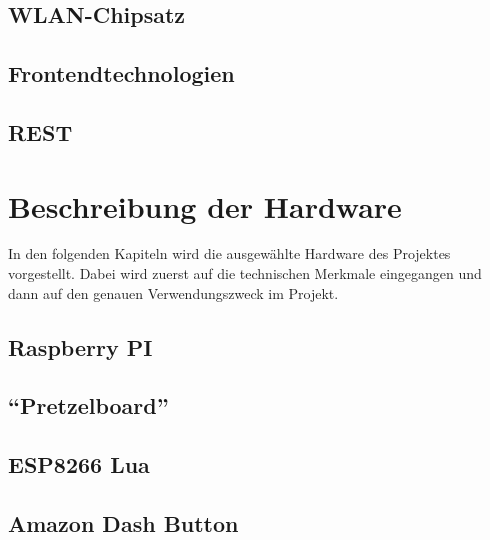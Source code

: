 \documentclass[ngerman]{scrartcl} %
\begin{document}
\subsection{WLAN-Chipsatz}
\label{sec:WLAN-CHipsatz-1} 

\subsection{Frontendtechnologien}
\label{sec:Frontendtechnologien-1}
 
\subsection{\ac{REST}}        
\label{sec:REST-1}  

\cite{Tilkov.2015}
  
\newpage
 
\section{Beschreibung der Hardware}        
\label{sec:Beschreibung der Hardware-1}  

In den folgenden Kapiteln wird die ausgewählte Hardware des Projektes vorgestellt. Dabei wird zuerst auf die technischen Merkmale eingegangen und dann auf den genauen Verwendungszweck im Projekt. 

\subsection{Raspberry PI}        
\label{sec:Raspberry PI-1} 


\newpage

\subsection{``Pretzelboard''}        
\label{sec:Pretzelboard-1} 


\newpage

\subsection{ESP8266 Lua}
\label{sec:ESP8266}



\subsection{Amazon Dash Button}
\label{sec:Amazon Dash Button}
\end{document}
